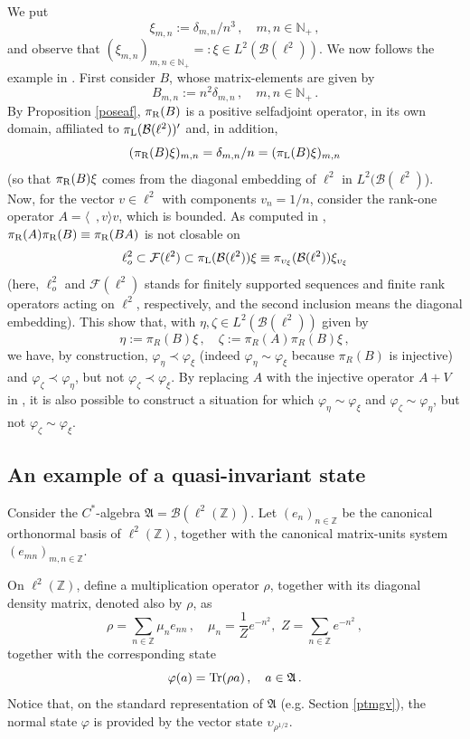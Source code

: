 \documentclass[12pt]{amsart}
\numberwithin{equation}{section}
\def\cb{{\mathcal B}}
\def\cf{{\mathcal F}}
\def\ga{{\mathfrak A}} \def\gpa{{\mathfrak a}}
\def\bn{{\mathbb N}}
\def\d{\delta}  \def\D{\Delta}
\def\r{\rho}\def\R{\mathop{\rm P}}
\def\f{\varphi}\def\ff{\phi} \def\F{\Phi}
\def\z{\zeta}
\def\tr{\mathop{\rm Tr}}
\begin{document}
We put
$$
\xi_{m,n}:=\d_{m,n}/n^3\,,\quad m,n\in\bn_+\,,
$$
and observe that  
$(\xi_{m,n})_{m,n\in\bn_+}=:\xi\in L^2(\cb(\ell^2))$.
We now follows the example in \cite{Re}. First consider $B$, whose matrix-elements are given by
$$
B_{m,n}:=n^2\d_{m,n}\,,\quad m,n\in\bn_+\,.
$$
By Proposition \ref{poseaf}, $\pi_{\rm R}(B)$ is a positive selfadjoint operator, in its own domain, affiliated to $\pi_{\rm L}(\cb(\ell^2))'$ and, in addition,
$$
(\pi_{\rm R}(B)\xi)_{m,n}=\d_{m,n}/n=(\pi_{\rm L}(B)\xi)_{m,n}
$$
(so that $\pi_{\rm R}(B)\xi$ comes from the diagonal embedding of $\ell^2$ in $L^2(\cb(\ell^2)$). Now, for the vector $v\in \ell^2$ with components $v_n=1/n$, consider the rank-one operator $A=\langle\,\,\,,v\rangle v$, which is bounded. As computed in \cite{Re}, 
$\pi_{\rm R}(A)\pi_{\rm R}(B)\equiv\pi_{\rm R}(BA)$
is not closable on
$$
\ell^2_o\subset\cf(\ell^2)\subset\pi_{\rm L}(\cb(\ell^2))\xi\equiv\pi_{\upsilon_\xi}(\cb(\ell^2))\xi_{\upsilon_\xi}
$$
(here, $\ell^2_o$ and $\cf(\ell^2)$ stands for finitely supported sequences and finite rank operators acting on $\ell^2$, respectively, and the second inclusion means the diagonal embedding).
This show that, with $\eta,\z\in L^2(\cb(\ell^2))$ given by 
$$
\eta:=\pi_R(B)\xi\,,\quad \z:=\pi_R(A)\pi_R(B)\xi\,,
$$
we have, by construction, $\f_{\eta}\prec\f_{\xi}$ (indeed $\f_{\eta}\sim\f_{\xi}$ because $\pi_R(B)$ is injective) and 
$\f_{\z}\prec\f_{\eta}$, but not $\f_{\z}\prec\f_{\xi}$. By replacing $A$ with the injective operator $A+V$ in \cite{Re},
it is also possible to construct a situation for which $\f_{\eta}\sim\f_{\xi}$ and 
$\f_{\z}\sim\f_{\eta}$, but not $\f_{\z}\sim\f_{\xi}$.


\subsection{An example of a quasi-invariant state} 

Consider the $C^*$-algebra $\ga=\mathcal B(\ell^2(\mathbb Z))$. Let $(e_n)_{n\in\mathbb Z}$ be the canonical orthonormal basis of $\ell^2(\mathbb Z)$, together with the canonical matrix-units system $(e_{mn})_{m,n\in\mathbb Z}$. 

On $\ell^2(\mathbb Z)$, define a multiplication operator $\r$, together with its 
diagonal density matrix, denoted also by $\r$, as
\begin{equation}
\label{ohrs}
\rho=\sum_{n\in\mathbb Z}\mu_ne_{nn}\,,\quad
\mu_n=\frac{1}{Z}e^{- n^2},\,\, Z=\sum_{n\in\mathbb Z}e^{-n^2}\,,
\end{equation}
together with the corresponding state 
$$
\f(a)=\tr(\rho a)\,,\quad a\in\ga\,.
$$
Notice that, on the standard representation of $\ga$ (e.g. Section \ref{ptmgv}), the normal state $\f$ is provided by the vector state
$\upsilon_{\r^{1/2}}$.
\end{document}
